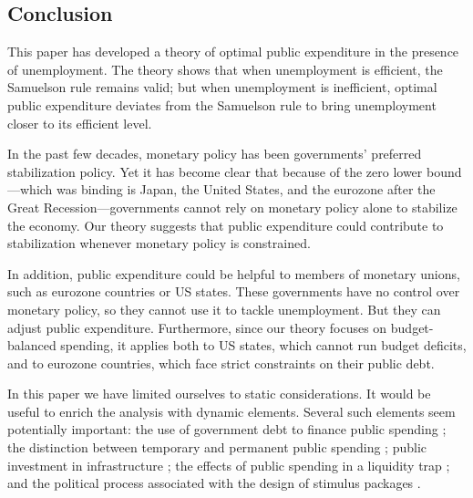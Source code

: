 \documentclass[letterpaper,12pt,leqno]{article}
\begin{document}
\begin{bibunit}
\section{Conclusion}\label{sec:ccl}

This paper has developed a theory of optimal public expenditure in the presence of unemployment. The theory shows that when unemployment is efficient, the Samuelson rule remains valid; but when unemployment is inefficient, optimal public expenditure deviates from the Samuelson rule to bring unemployment closer to its efficient level. 

In the past few decades, monetary policy has been governments' preferred stabilization policy. Yet it has become clear that because of the zero lower bound---which was binding is Japan, the United States, and the eurozone after the Great Recession---governments cannot rely on monetary policy alone to stabilize the economy. Our theory suggests that public expenditure could contribute to stabilization whenever monetary policy is constrained.

In addition, public expenditure could be helpful to members of monetary unions, such as eurozone countries or US states. These governments have no control over monetary policy, so they cannot use it to tackle unemployment. But they can adjust public expenditure. Furthermore, since our theory focuses on budget-balanced spending, it applies both to US states, which cannot run budget deficits, and to eurozone countries, which face strict constraints on their public debt. 
 
In this paper we have limited ourselves to static considerations. It would be useful to enrich the analysis with dynamic elements. Several such elements seem potentially important: the use of government debt to finance public spending ; the distinction between temporary and permanent public spending ; public investment in infrastructure ; the effects of public spending in a liquidity trap ; and the political process associated with the design of stimulus packages .

\begin{small}\putbib\end{small}

\end{bibunit}
\end{document}
